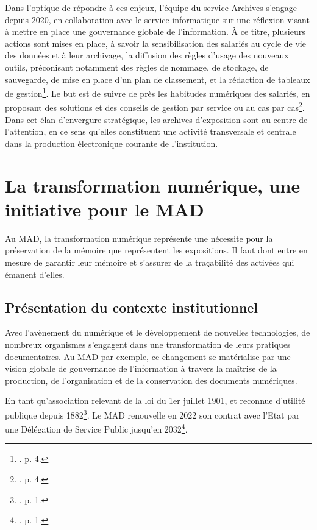 Dans l’optique de répondre à ces enjeux, l’équipe du service Archives  s’engage depuis 2020, en collaboration avec le service informatique sur une réflexion visant à mettre en place une gouvernance globale de l’information. À ce titre, plusieurs actions sont mises en place, à savoir la sensibilisation des salariés au cycle de vie des données et à leur archivage, la diffusion des règles d’usage des nouveaux outils, préconisant notamment des règles de nommage, de stockage, de sauvegarde, de mise en place d’un plan de classement, et la rédaction de tableaux de gestion\footnote{\cite{archives-en-musees-electroniques}. p. 4.}. Le but est de suivre de près les habitudes numériques des salariés, en proposant des solutions et des conseils de gestion par service ou au cas par cas\footnote{\cite{archives-en-musees-electroniques}. p. 4.}. Dans cet élan d’envergure stratégique, les archives d’exposition sont au centre de l’attention, en ce sens qu’elles constituent une activité transversale et centrale dans la production électronique courante de l’institution.



\section{La transformation numérique, une initiative pour le MAD}

Au MAD, la transformation numérique représente une nécessite pour la préservation de la mémoire que représentent les expositions. Il faut dont entre en mesure de garantir leur mémoire et s'assurer de la traçabilité des activées qui émanent d'elles.

\subsection*{Présentation du contexte institutionnel}

Avec l’avènement du numérique et le développement de nouvelles technologies, de nombreux organismes s’engagent dans une transformation de leurs pratiques documentaires. Au MAD par  exemple,  ce changement se matérialise par une vision globale de gouvernance de l’information à travers la maîtrise de la production, de l’organisation et de la conservation des documents numériques.

En tant qu’association relevant de la loi du 1er juillet 1901, et reconnue d’utilité publique depuis 1882\footnote{\cite{bomel-dion-mad-y-vas-2022}. p. 1.}. Le MAD renouvelle en 2022 son contrat avec l’Etat par une Délégation de Service Public jusqu’en 2032\footnote{\cite{bomel-dion-mad-y-vas-2022}. p. 1.}.


